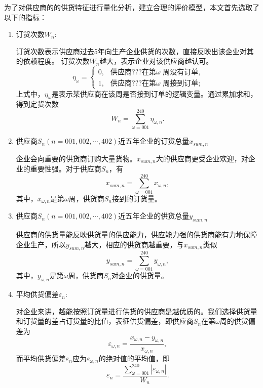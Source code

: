 为了对供应商的的供货特征进行量化分析，建立合理的评价模型，本文首先选取了以下的指标：
\begin{enumerate}

\item 订货次数$W_n$:

订货次数表示供应商过去5年向生产企业供货的次数，直接反映出该企业对其的依赖程度。
订货次数$W_n$越大，表示企业对该供应商越认可。
\begin{equation}
    \eta_{\omega}=
\begin{cases}
0,& \text{供应商$???$在第$\omega$ 周没有订单,}
\\
1,& \text{供应商$???$在第$\omega$ 周接到订单;}
\end{cases}
\end{equation}
\noindent 上式中，$\eta_{\omega}$是表示某供应商在该周是否接到订单的逻辑变量。通过累加求和，得到定货次数
\begin{equation}
    W_n=\sum_{\omega=001}^{240}\eta_{\omega,n}.
\end{equation}

\item 供应商$S_n(n=001,002,\cdots,402)$近五年企业的订货总量$x_{sum,n}$

企业会向重要的供货商订购大量货物。$x_{sum,n}$大的供应商更受企业欢迎，对企业的重要性强。对于供应商$S_n$，有
\begin{equation}
    x_{sum,n}=\sum_{\omega=001}^{240}x_{\omega,n},
\end{equation}
其中，$x_{\omega,n}$是第$\omega$周，供货商$S_n$接到的订货量。

\item 供应商$S_n(n=001,002,\cdots,402)$近五年企业的供货总量$y_{sum,n}$

供应商的供货量能反映供货量的供应能力，供应能力强的供货商能有力地保障企业生产，所以$y_{sum,n}$越大，相应的供货商越重要，与$x_{sum,n}$类似
\begin{equation}
    y_{sum,n}=\sum_{\omega=001}^{240}y_{\omega,n},
\end{equation}
其中，$y_{\omega,n}$是第$\omega$周，供货商$S_n$对企业的供货量。

\item 平均供货偏差$\varepsilon_n$:

对企业来讲，越能按照订货量进行供货的供应商是越优质的。我们选择供货量和订货量的差占订货量的比值，表征供货偏差，即供应商$S_n$在第$\omega$周的供货偏差为
\begin{equation}
    \varepsilon_{\omega,n}=\frac{x_{\omega,n}-y_{\omega,n}}{x_{\omega,n}},
\end{equation}
而平均供货偏差$\varepsilon_n$应为$\varepsilon_{\omega,n}$的绝对值的平均值，即
\begin{equation}
    \varepsilon_n=\frac{\sum_{\omega=001}^{240}|\varepsilon_{\omega,n}|}{W_n}.
\end{equation}


\end{enumerate}
